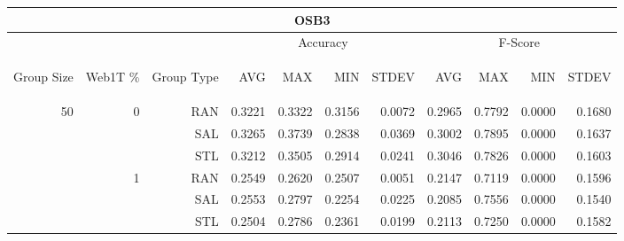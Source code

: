 \begin{center}
\begin{table}[htbp] 
 \begin{center}
\begin{tabular}{ | r | r | r | r | r | r | r | r | r | r | r |}
\hline
\multicolumn{11}{|c|}{OSB3}\\
\hline
 & & & \multicolumn{4}{|c|}{Accuracy} & \multicolumn{4}{|c|}{F-Score}\\ \cline{4-11}
\begin{sideways}Group Size\end{sideways} & \begin{sideways}Web1T \%\end{sideways} & \begin{sideways}Group Type\end{sideways} & \begin{sideways}AVG\end{sideways} & \begin{sideways}MAX\end{sideways} & \begin{sideways}MIN\end{sideways} & \begin{sideways}STDEV\end{sideways} & \begin{sideways}AVG\end{sideways} & \begin{sideways}MAX\end{sideways} & \begin{sideways}MIN\end{sideways} & \begin{sideways}STDEV\end{sideways}\\
\hline
\multirow{18}{*}{50}
 & \multirow{3}{*}{0} & RAN & 0.3221 & 0.3322 & 0.3156 & 0.0072 & 0.2965 & 0.7792 & 0.0000 & 0.1680\\ \cline{3-11}
 &   & SAL & 0.3265 & 0.3739 & 0.2838 & 0.0369 & 0.3002 & 0.7895 & 0.0000 & 0.1637\\ \cline{3-11}
 &   & STL & 0.3212 & 0.3505 & 0.2914 & 0.0241 & 0.3046 & 0.7826 & 0.0000 & 0.1603\\ \cline{2-11}
 & \multirow{3}{*}{1} & RAN & 0.2549 & 0.2620 & 0.2507 & 0.0051 & 0.2147 & 0.7119 & 0.0000 & 0.1596\\ \cline{3-11}
 &   & SAL & 0.2553 & 0.2797 & 0.2254 & 0.0225 & 0.2085 & 0.7556 & 0.0000 & 0.1540\\ \cline{3-11}
 &   & STL & 0.2504 & 0.2786 & 0.2361 & 0.0199 & 0.2113 & 0.7250 & 0.0000 & 0.1582\\ \cline{2-11}

\end{tabular}
\end{center}
\end{table}
\end{center}
